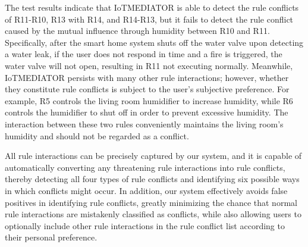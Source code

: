 The test results indicate that IoTMEDIATOR is able to detect the rule conflicts of R11-R10, R13 with R14, and R14-R13, but it fails to detect the rule conflict caused by the mutual influence through humidity between R10 and R11. Specifically, after the smart home system shuts off the water valve upon detecting a water leak, if the user does not respond in time and a fire is triggered, the water valve will not open, resulting in R11 not executing normally. Meanwhile, IoTMEDIATOR persists with many other rule interactions; however, whether they constitute rule conflicts is subject to the user's subjective preference. For example, R5 controls the living room humidifier to increase humidity, while R6 controls the humidifier to shut off in order to prevent excessive humidity. The interaction between these two rules conveniently maintains the living room’s humidity and should not be regarded as a conflict.

All rule interactions can be precisely captured by our system, and it is capable of automatically converting any threatening rule interactions into rule conflicts, thereby detecting all four types of rule conflicts and identifying six possible ways in which conflicts might occur. In addition, our system effectively avoids false positives in identifying rule conflicts, greatly minimizing the chance that normal rule interactions are mistakenly classified as conflicts, while also allowing users to optionally include other rule interactions in the rule conflict list according to their personal preference.

